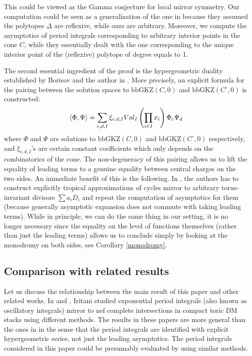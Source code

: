 \documentclass[11pt,reqno]{amsart}
\def\Vol {{\rm Vol}}
\theoremstyle{definition}
\numberwithin{equation}{section}
\begin{document}
\smallskip

This could be viewed as the Gamma conjecture for local mirror symmetry. Our computation could be seen as a generalization of the one in \cite{AGIS} because they assumed the polytopes $\Delta$ are reflexive, while ours are arbitrary. Moreover, we compute the asymptotics of period integrals corresponding to arbitrary interior points in the cone $C$, while they essentially dealt with the one corresponding to the unique interior point of the (reflexive) polytope of degree equals to 1.

\smallskip

The second essential ingredient of the proof is the hypergeometric duality established by Borisov and the author in \cite{BHanDuality}. More precisely, an explicit formula for the pairing between the solution spaces to $\mathrm{bbGKZ}(C,0)$ and $\mathrm{bbGKZ}(C^{\circ},0)$ is constructed: 
\begin{align*}
		\langle \Phi,\Psi\rangle = \sum_{c,d,I}\xi_{c,d,I}\Vol_I\left(\prod_{i\in I}x_i\right)\Phi_c\Psi_d
\end{align*}
where $\Phi$ and $\Psi$ are solutions to $\mathrm{bbGKZ}(C,0)$ and $\mathrm{bbGKZ}(C^{\circ},0)$ respectively, and $\xi_{c,d,I}$'s are certain constant coefficients which only depends on the combinatorics of the cone. The non-degeneracy of this pairing allows us to lift the equality of leading terms to a genuine equality between central charges on the two sides. An immediate benefit of this is the following. In \cite{AGIS}, the authors has to construct explicitly tropical approximations of cycles mirror to arbitrary torus-invariant divisors $\sum a_iD_i$ and repeat the computation of asymptotics for them (because generally asymptotic expansion does not commute with taking leading terms). While in principle, we can do the same thing in our setting, it is no longer necessary since the equality on the level of functions themselves (rather than just the leading terms) allows us to conclude simply by looking at the monodromy on both sides, see Corollary \ref{monodromy}.

\subsection{Comparison with related results}

Let us discuss the relationship between the main result of this paper and other related works. In \cite{I-1} and \cite{I-2}, Iritani studied exponential period integrals (also known as oscillatory integrals) mirror to nef complete intersections in compact toric DM stacks using different methods. The results in these papers are more general than the ones in \cite{AGIS} in the sense that the period integrals are identified with explicit hypergeometric series, not just  the leading asymptotics. The period integrals considered in this paper could be presumably evaluated by using similar methods.
\end{document}
